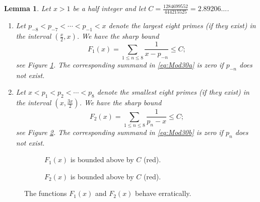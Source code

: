 \documentclass[10pt,a4paper]{amsart}
\theoremstyle{plain}
\newtheorem{lemma}[theorem]{Lemma}
\begin{document}
\begin{lemma}\label{Lemma:Sieve30}
    Let $x>1$ be a half integer and let $C = \frac{1284699552}{444215525}= 2.89206\ldots$.  
    \begin{enumerate}
        \item Let $p_{-8} < p_{-7} < \cdots < p_{-1} < x$ denote the largest eight primes (if they exist) in the interval $(\frac{x}{2},x)$.  
            We have the sharp bound\label{p:C1}
            \begin{equation}\label{eq:Mod30a}
                F_1(x) = \sum_{1 \leq n \leq 8}  \frac{1}{  x-p_{-n} } \leq  C;
            \end{equation}
            see Figure \ref{Figure:C1}.
            The corresponding summand in \eqref{eq:Mod30a} is zero if $p_{-n}$ does not exist.  
        
        \item Let $x<p_1 <p_2<\cdots < p_8$ denote the smallest eight primes (if they exist)
            in the interval $(x,\frac{3x}{2})$.  We have the sharp bound\label{p:C2}
            \begin{equation}\label{eq:Mod30b}
                F_2(x) = \sum_{1 \leq n \leq 8} \frac{1}{p_n -x} \leq  C;
            \end{equation}
		see Figure \ref{Figure:C2}.
            The corresponding summand in \eqref{eq:Mod30b} is zero if $p_{n}$ does not exist.  
    \end{enumerate}
\end{lemma}

\setcounter{figure}{1}
\begin{figure}
    \centering
    \begin{subfigure}[t]{0.47\textwidth}
    \centering

    \caption{$F_1(x)$ is bounded above by $C$ (red).}
    \label{Figure:C1}
    \end{subfigure}
    \quad
    \begin{subfigure}[t]{0.47\textwidth}
    \centering

    \caption{$F_2(x)$ is bounded above by $C$ (red).}
    \label{Figure:C2}
    \end{subfigure}
    \caption{The functions $F_1(x)$ and $F_2(x)$ behave erratically.}
    \label{Figure:C1C2}
\end{figure}
\end{document}
